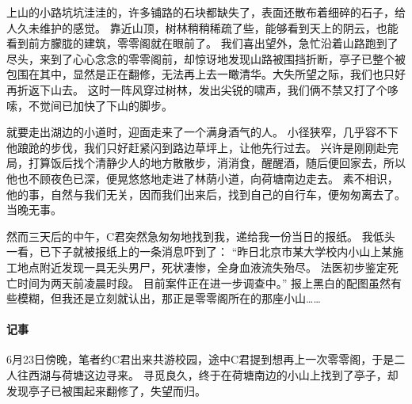 上山的小路坑坑洼洼的，许多铺路的石块都缺失了，表面还散布着细碎的石子，给人久未维护的感觉。
靠近山顶，树林稍稍稀疏了些，能够看到天上的阴云，也能看到前方朦胧的建筑，零零阁就在眼前了。
我们喜出望外，急忙沿着山路跑到了尽头，来到了心心念念的零零阁前，却惊讶地发现山路被围挡折断，亭子已整个被包围在其中，显然是正在翻修，无法再上去一瞰清华。大失所望之际，我们也只好再折返下山去。
这时一阵风穿过树林，发出尖锐的啸声，我们俩不禁又打了个哆嗦，不觉间已加快了下山的脚步。

就要走出湖边的小道时，迎面走来了一个满身酒气的人。
小径狭窄，几乎容不下他踉跄的步伐，我们只好赶紧闪到路边草坪上，让他先行过去。
兴许是刚刚赴完局，打算饭后找个清静少人的地方散散步，消消食，醒醒酒，随后便回家去，所以他也不顾夜色已深，便晃悠悠地走进了林荫小道，向荷塘南边走去。
素不相识，他的事，自然与我们无关，因而我们出来后，找到自己的自行车，便匆匆离去了。
当晚无事。

然而三天后的中午，C君突然急匆匆地找到我，递给我一份当日的报纸。
我低头一看，已下子就被报纸上的一条消息吓到了：
“昨日北京市某大学校内小山上某施工地点附近发现一具无头男尸，死状凄惨，全身血液流失殆尽。
法医初步鉴定死亡时间为两天前凌晨时段。
目前案件正在进一步调查中。”
报上黑白的配图虽然有些模糊，但我还是立刻就认出，那正是零零阁所在的那座小山……

\vfill

\paragraph{记事}
6月23日傍晚，笔者约C君出来共游校园，途中C君提到想再上一次零零阁，于是二人往西湖与荷塘这边寻来。
寻觅良久，终于在荷塘南边的小山上找到了亭子，却发现亭子已被围起来翻修了，失望而归。
